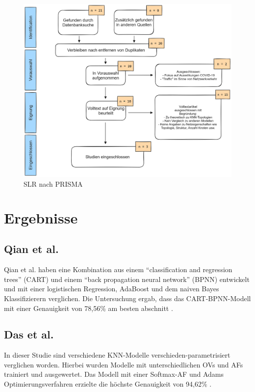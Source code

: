 \documentclass{scrartcl}
\begin{document}
\begin{figure}[h!]
   \centering
   \caption{SLR nach PRISMA}
   \label{abb1}
   \includegraphics[scale=0.28]{Bilder/prisma-exported.png}
\end{figure}

\section{Ergebnisse}

\subsection{Qian et al.}

Qian et al. haben eine Kombination aus einem \enquote{classification and regression trees} (CART)
und einem \enquote{back propagation neural network} (BPNN) entwickelt und mit einer 
logistischen Regression, AdaBoost und dem naiven Bayes Klassifizierern verglichen.
Die Untersuchung ergab, dass das CART-BPNN-Modell mit einer Genauigkeit von 78,56\% 
am besten abschnitt \cite{qian}.

\subsection{Das et al.}
In dieser Studie sind verschiedene KNN-Modelle verschieden-parametrisiert verglichen worden.
Hierbei wurden Modelle mit unterschiedlichen OVs und AFs trainiert und ausgewertet. 
Das Modell mit einer Softmax-AF und Adams Optimierungsverfahren erzielte die höchste
Genauigkeit von 94,62\% \cite{das}.
\end{document}
